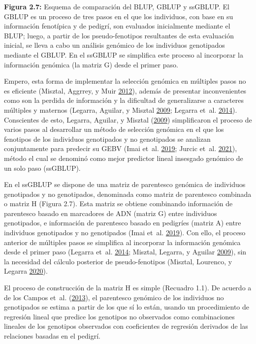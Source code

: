 \documentclass[11pt,spanish,a4paper,oneside,]{book} %
\begin{document}
\noindent 
\textbf{Figura 2.7:} Esquema de comparación del BLUP, GBLUP y ssGBLUP. El GBLUP es un proceso de tres pasos en el que los individuos, con base en su información fenotípica y de pedigrí, son evaluados inicialmente mediante el BLUP; luego, a partir de los pseudo-fenotipos resultantes de esta evaluación inicial, se lleva a cabo un análisis genómico de los individuos genotipados mediante el GBLUP. En el ssGBLUP se simplifica este proceso al incorporar la información genómica (la matriz G) desde el primer paso.

\hspace*{1em}

Empero, esta forma de implementar la selección genómica en múltiples pasos no es eficiente (Misztal, Aggrrey, y Muir \protect\hyperlink{ref-cite:14}{2012}), además de presentar inconvenientes como son la perdida de información y la dificultad de generalizarse a caracteres múltiples y maternos (Legarra, Aguilar, y Misztal \protect\hyperlink{ref-cite:17}{2009}; Legarra et~al. \protect\hyperlink{ref-cite:15}{2014}). Conscientes de esto, Legarra, Aguilar, y Misztal (\protect\hyperlink{ref-cite:17}{2009}) simplificaron el proceso de varios pasos al desarrollar un método de selección genómica en el que los fenotipos de los individuos genotipados y no genotipados se analizan conjuntamente para predecir su GEBV (Imai et~al. \protect\hyperlink{ref-cite:20}{2019}; Jurcic et~al. \protect\hyperlink{ref-cite:11}{2021}), método el cual se denominó como mejor predictor lineal insesgado genómico de un solo paso (ssGBLUP).

En el ssGBLUP se dispone de una matriz de parentesco genómica de individuos genotipados y no genotipados, denominada como matriz de parentesco combinada o matriz H (Figura 2.7). Esta matriz se obtiene combinando información de parentesco basado en marcadores de ADN (matriz G) entre individuos genotipados, e información de parentesco basado en pedigríes (matriz A) entre individuos genotipados y no genotipados (Imai et~al. \protect\hyperlink{ref-cite:20}{2019}). Con ello, el proceso anterior de múltiples pasos se simplifica al incorporar la información genómica desde el primer paso (Legarra et~al. \protect\hyperlink{ref-cite:15}{2014}; Misztal, Legarra, y Aguilar \protect\hyperlink{ref-cite:16}{2009}), sin la necesidad del cálculo posterior de pseudo-fenotipos (Misztal, Lourenco, y Legarra \protect\hyperlink{ref-cite:18}{2020}).

El proceso de construcción de la matriz H es simple (Recuadro 1.1). De acuerdo a de los Campos et~al. (\protect\hyperlink{ref-cite:31}{2013}), el parentesco genómico de los individuos no genotipados se estima a partir de los que sí lo están, usando un procedimiento de regresión lineal que predice los genotipos no observados como combinaciones lineales de los genotipos observados con coeficientes de regresión derivados de las relaciones basadas en el pedigrí.
\end{document}
